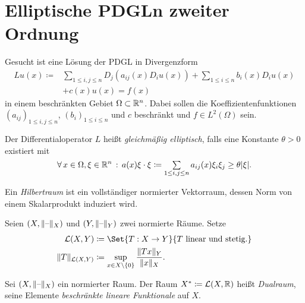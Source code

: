 \documentclass{cheat-sheet}
\begin{document}


\section{Elliptische PDGLn zweiter Ordnung}

\begin{prob}
  Gesucht ist eine Lösung der PDGL in Divergenzform
  \begin{align*}
    Lu(x) \coloneqq & \sum_{1 \leq i, j \leq n} D_j (a_{ij}(x) D_{i} u(x)) + \sum_{1 \leq i \leq n} b_i(x) D_i u(x) \\
      & + c(x) u(x) = f(x) \tag{6.1}
  \end{align*}
  in einem beschränkten Gebiet $\Omega \subset \mathbb{R}^n$. Dabei sollen die Koeffizientenfunktionen $(a_{ij})_{1 \leq i, j \leq n}$, $(b_i)_{1 \leq i \leq n}$ und $c$ beschränkt und $f \in L^2(\Omega)$ sein.
\end{prob}

\begin{defn}
  Der Differentialoperator $L$ heißt \emph{gleichmäßig elliptisch}, falls eine Konstante $\theta > 0$ existiert mit
  \[ \fa{x \in \Omega, \xi \in \R^n} a(x) \xi \cdot \xi \coloneqq \sum_{1 \leq i, j \leq n} a_{ij}(x) \xi_i \xi_j \geq \theta \abs{\xi}. \]
\end{defn}



\begin{defn}
  Ein \emph{Hilbertraum} ist ein vollständiger normierter Vektorraum, dessen Norm von einem Skalarprodukt induziert wird.
\end{defn}

\begin{defn}
  Seien $(X, \lVert\text{--}\rVert_X)$ und $(Y, \lVert\text{--}\rVert_Y)$ zwei normierte Räume. Setze
  \begin{align*}
    \mathcal{L}(X, Y) & \coloneqq \Set{ T : X \to Y }{ T \text{ linear und stetig.} } \\
    \norm{T}_{\mathcal{L}(X, Y)} & \coloneqq \sup_{x \in X \setminus \{ 0 \}} \frac{\norm{Tx}_Y}{\norm{x}_X}.
  \end{align*}
\end{defn}

\begin{defn}
  Sei $(X, \lVert\text{--}\rVert_X)$ ein normierter Raum. Der Raum $X^{*} \coloneqq \mathcal{L}(X, \mathbb{R})$ heißt \emph{Dualraum}, seine Elemente \emph{beschränkte lineare Funktionale} auf $X$.
\end{defn}
\end{document}
